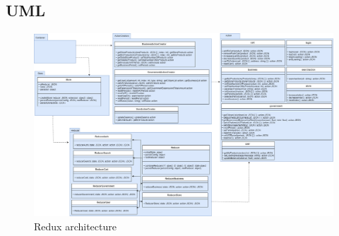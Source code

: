 \begin{landscape}
	\subsection{UML} 
	\begin{figure}[h]
		\centering\includegraphics[scale = 0.295]{res/images/ReduxDiagram.png}
		\caption{Redux architecture}
	\end{figure}
\end{landscape}